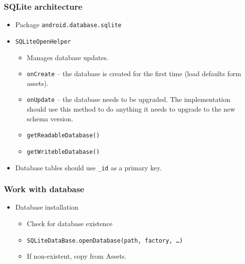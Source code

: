\documentclass[10pt,xcolor=pdflatex]{beamer}
\begin{document}
\begin{frame}[fragile]\frametitle{SQLite architecture}
\begin{itemize}
	\item Package \texttt{android.database.sqlite}
	\item \texttt{SQLiteOpenHelper}
	  \begin{itemize}
		\item Manages database updates.
		\item \texttt{onCreate} --  the database is created for the first time (load defaults form assets).
		\item \texttt{onUpdate} -- the database needs to be upgraded. The implementation should use this method to do anything it needs to upgrade to the new schema version.
        \item \texttt{getReadableDatabase()}
		\item \texttt{getWritebleDatabase()}
	  \end{itemize}
    \item Database tables should use \texttt{\_id} as a primary key.
\end{itemize}
\end{frame}

\begin{frame}[fragile]\frametitle{Work with database}
\begin{itemize}
    \item Database installation
      \begin{itemize}
    	\item Check for database existence
        \item[] \texttt{SQLiteDataBase.openDatabase(path, factory, \ldots)}
   		\item If non-existent, copy from Assets.
      \end{itemize}
\end{itemize}
\end{frame}
\end{document}
